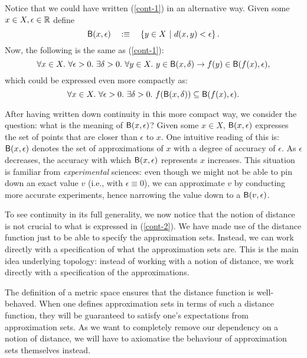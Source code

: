 Notice that we could have written (\ref{cont-1}) in an alternative way. Given some $x \in X,
\epsilon \in \mathbb{R}{}$ define
\begin{equation*}
  \mathsf{B}(x, \epsilon) \quad:\equiv\quad \left\{  y \in X ~|~ d(x, y) < \epsilon  \right\}.
\end{equation*}
Now, the following is the same as (\ref{cont-1}):
\begin{equation*}
  \forall x \in X.~ \forall \epsilon > 0.~ \exists \delta > 0.~ \forall y \in X.~ y \in \mathsf{B}(x, \delta) \rightarrow f(y) \in \mathsf{B}(f(x), \epsilon),
\end{equation*}
which could be expressed even more compactly as:
\begin{equation}\label{cont-2}
  \forall x \in X.~ \forall \epsilon > 0.~ \exists \delta > 0.~ f(\mathsf{B}(x, \delta)) \subseteq \mathsf{B}(f(x), \epsilon).
\end{equation}

After having written down continuity in this more compact way, we consider the question:
what is the meaning of $\mathsf{B}(x, \epsilon)$? Given some $x \in X$, $\mathsf{B}(x, \epsilon)$ expresses the set
of points that are closer than $\epsilon$ to $x$. One intuitive reading of this is: $\mathsf{B}(x, \epsilon)$
denotes the set of approximations of $x$ with a degree of accuracy of $\epsilon$. As $\epsilon$
decreases, the accuracy with which $\mathsf{B}(x, \epsilon)$ represents $x$ increases. This situation
is familiar from \emph{experimental} sciences: even though we might not be able to pin
down an exact value $v$ (i.e., with $\epsilon \equiv 0$), we can approximate $v$ by conducting more
accurate experiments, hence narrowing the value down to a $\mathsf{B}(v, \epsilon)$.

To see continuity in its full generality, we now notice that the notion of distance is not
crucial to what is expressed in (\ref{cont-2}). We have made use of the distance function
just to be able to specify the approximation sets. Instead, we can work directly with a
specification of what the approximation sets are. This is the main idea underlying
topology: instead of working with a notion of distance, we work directly with a
specification of the approximations.

The definition of a metric space ensures that the distance function is well-behaved. When
one defines approximation sets in terms of such a distance function, they will be
guaranteed to satisfy one's expectations from approximation sets. As we want to completely
remove our dependency on a notion of distance, we will have to axiomatise the behaviour of
approximation sets themselves instead.

